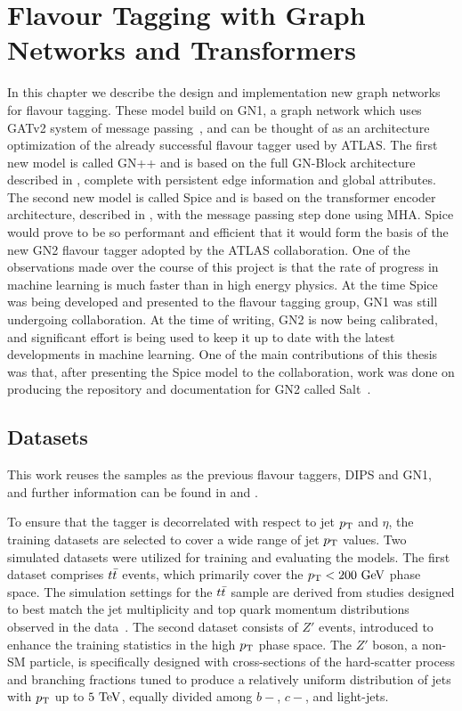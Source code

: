 
\chapter{Flavour Tagging with Graph Networks and Transformers}
\label{ch:spice}

In this chapter we describe the design and implementation new graph networks for flavour tagging.
These model build on GN1, a graph network which uses GATv2 system of message passing~\cite{GATv2}, and can be thought of as an architecture optimization of the already successful flavour tagger used by ATLAS.
The first new model is called GN++ and is based on the full GN-Block architecture described in , complete with persistent edge information and global attributes.
The second new model is called Spice and is based on the transformer encoder architecture, described in , with the message passing step done using MHA.
Spice would prove to be so performant and efficient that it would form the basis of the new GN2 flavour tagger adopted by the ATLAS collaboration.
One of the observations made over the course of this project is that the rate of progress in machine learning is much faster than in high energy physics.
At the time Spice was being developed and presented to the flavour tagging group, GN1 was still undergoing collaboration.
At the time of writing, GN2 is now being calibrated, and significant effort is being used to keep it up to date with the latest developments in machine learning.
One of the main contributions of this thesis was that, after presenting the Spice model to the collaboration, work was done on producing the repository and documentation for GN2 called Salt~\cite{Salt}.

\section{Datasets}

This work reuses the samples as the previous flavour taggers, DIPS and GN1, and further information can be found in \textcite{AlexThesis} and \textcite{GN1}.

To ensure that the tagger is decorrelated with respect to jet $p_{\text{T}}$ and $\eta$, the training datasets are selected to cover a wide range of jet $p_{\text{T}}$ values.
Two simulated datasets were utilized for training and evaluating the models.
The first dataset comprises $t\bar{t}$ events, which primarily cover the $\pt < 200~\GeV$ phase space.
The simulation settings for the $t\bar{t}$ sample are derived from studies designed to best match the jet multiplicity and top quark momentum distributions observed in the data~\cite{ttbar1, ttbar2}.
The second dataset consists of $Z'$ events, introduced to enhance the training statistics in the high $p_{\text{T}}$ phase space.
The $Z'$ boson, a non-SM particle, is specifically designed with cross-sections of the hard-scatter process and branching fractions tuned to produce a relatively uniform distribution of jets with $p_{\text{T}}$ up to $5~\TeV$, equally divided among $b-$, $c-$, and light-jets.

